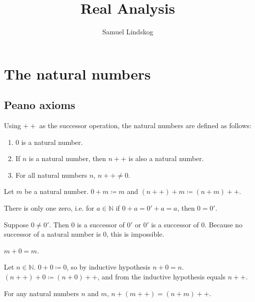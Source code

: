 \documentclass{article}
\title{Real Analysis}
\author{Samuel Lindskog}
\begin{document}
\maketitle
{}
\tableofcontents
{}
\clearpage
{}
\setcounter{page}{1}

\section{The natural numbers}
\subsection{Peano axioms}
\begin{definition}
	Using \(++\) as the successor operation, the natural numbers are defined as follows:
	\begin{enumerate}
		\item \(0\) is a natural number.
		\item If \(n\) is a natural number, then \(n++\) is also a natural number.
		\item For all natural numbers \(n\), \(n++\neq 0\).
	\end{enumerate}
\end{definition}
\begin{definition}
	Let \(m\) be a natural number. \(0+m\coloneq m\) and \((n++)+m\coloneq(n+m)++\).
\end{definition}
\begin{proposition}
	\label{uniquezero}
	There is only one zero, i.e. for \(a\in\mathbb{N}\) if \(0+a=0'+a=a\), then \(0=0'\).
\end{proposition}
	\begin{IEEEproof}
		Suppose \(0\neq 0'\). Then \(0\) is a successor of \(0'\) or \(0'\) is a successor of \(0\). Because no successor of a natural number is \(0\), this is impossible.
	\end{IEEEproof}
\begin{proposition}
	\label{zerocommute}
	\(m+0=m\).
\end{proposition}
	\begin{IEEEproof}
		Let \(n\in\mathbb{N}\). \(0+0\coloneq 0\), so by inductive hypothesis \(n+0=n\). \((n++)+0\coloneq(n+0)++\), and from the inductive hypothesis equals \(n++\).
	\end{IEEEproof}
\begin{lemma}
	\label{rightaddition}
	For any natural numbers \(n\) and \(m\), \(n+(m++)=(n+m)++\).
\end{lemma}
\end{document}

